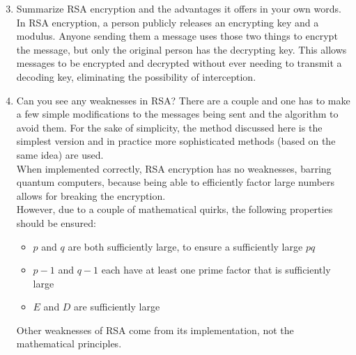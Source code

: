\documentclass{article}
\begin{document}
\begin{enumerate}
\setcounter{enumi}{2}
    \item Summarize RSA encryption and the advantages it offers in your own words.\\
    In RSA encryption, a person publicly releases an encrypting key and a modulus. Anyone sending them a message uses those two things to encrypt the message, but only the original person has the decrypting key. This allows messages to be encrypted and decrypted without ever needing to transmit a decoding key, eliminating the possibility of interception.
    \item Can you see any weaknesses in RSA? There are a couple and one has to make a few simple modifications to the messages being sent and the algorithm to avoid them. For the sake of simplicity, the method discussed here is the simplest version and in practice more sophisticated methods (based on the same idea) are used.\\
    When implemented correctly, RSA encryption has no weaknesses, barring quantum computers, because being able to efficiently factor large numbers allows for breaking the encryption.\\
    However, due to a couple of mathematical quirks, the following properties should be ensured:
    \begin{itemize}
        \item $p$ and $q$ are both sufficiently large, to ensure a sufficiently large $pq$
        \item $p-1$ and $q-1$ each have at least one prime factor that is sufficiently large
        \item $E$ and $D$ are sufficiently large
    \end{itemize}
    Other weaknesses of RSA come from its implementation, not the mathematical principles.
\end{enumerate}
\end{document}
